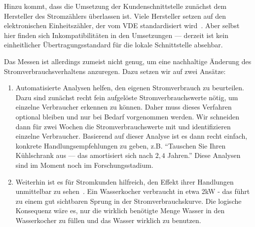 \documentclass[12pt,BCOR=8.5mm]{scrartcl}
\begin{document}
Hinzu kommt, dass die Umsetzung der Kundenschnittstelle zunächst dem
Hersteller des Stromzählers überlassen ist. Viele Hersteller setzen auf den
elektronischen Einheitszähler, der vom VDE 
standardisiert wird~\cite{fnn10lastenheft}. Aber
selbst hier finden sich Inkompatibilitäten in den Umsetzungen ---
derzeit ist kein einheitlicher Übertragungsstandard für die lokale
Schnittstelle absehbar.

Das Messen ist allerdings zumeist nicht genug, um eine nachhaltige
Änderung des Stromverbrauchsverhaltens anzuregen. Dazu setzen wir auf
zwei Ansätze:

\begin{enumerate}
  \item Automatisierte Analysen helfen, den eigenen
    Stromverbrauch zu beurteilen. Dazu sind zunächst recht fein
    aufgelöste Stromverbrauchswerte nötig, um einzelne Verbraucher
    erkennen zu können. Daher muss dieses Verfahren optional bleiben und
    nur bei Bedarf vorgenommen werden. Wir schneiden dann für zwei
    Wochen die Stromverbrauchswerte mit und identifizieren einzelne
    Verbraucher. Basierend auf dieser Analyse ist es dann recht einfach,
    konkrete Handlungsempfehlungen zu geben, z.B. "`Tauschen Sie Ihren
    Kühlschrank aus --- das amortisiert sich nach $2,4$ Jahren."' 
    Diese Analysen sind im Moment noch im Forschungsstadium.
  \item Weiterhin ist es für Stromkunden hilfreich, den Effekt ihrer
    Handlungen unmittelbar zu sehen~\cite{darby2006feedback}. Ein Wasserkocher 
    verbraucht in etwa 2kW - das führt zu einem
    gut sichtbaren Sprung in der Stromverbrauchskurve. Die logische
    Konsequenz wäre es, nur die wirklich benötigte Menge Wasser in den
    Wasserkocher zu füllen und das Wasser wirklich zu benutzen.
\end{enumerate}
\end{document}
